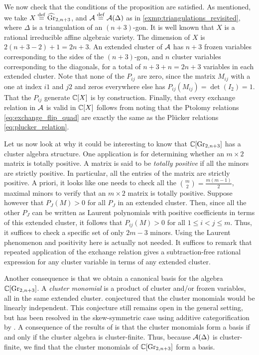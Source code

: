 We now check that the conditions of the proposition are satisfied. As mentioned, we
take $X \overset{\mathrm{def}}{=} \widehat{\operatorname{Gr}}_{2, n+3}$, and $\mathcal{A} \overset{\mathrm{def}}{=} \mathcal{A}(\Delta)$ as in
\cref{exmp:triangulations_revisited}, where $\Delta$ is a triangulation of an
$(n+3)$-gon. It is well known \cite[Proposition 12.7]{FominZelevinsky2003CAFin} that
$X$ is a rational irreducible affine algebraic variety. The dimension of $X$ is $2 (n+3
	- 2) + 1 = 2n +3$. An extended cluster of $\mathcal{A}$ has $n+3$ frozen variables
corresponding to the sides of the $(n+3)$-gon, and $n$ cluster variables corresponding
to the diagonals, for a total of $n+3 + n = 2n +3$ variables in each extended cluster.
Note that none of the $P_{ij}$ are zero, since the matrix $M_{ij}$ with a one at index
$i1$ and $j2$ and zeros everywhere else has $P_{ij}(M_{ij}) = \det(I_2) = 1$. That the
$P_{ij}$ generate $\mathbb{C}[X]$ is by construction. Finally, that every exchange relation
in $\mathcal{A}$ is valid in $\mathbb{C}[X]$ follows from noting that the Ptolomy relations
\cref{eq:exchange_flip_quad} are exactly the same as the Plücker relations
\cref{eq:plucker_relation}.

\medskip

Let us now look at why it could be interesting to know that $\mathbb{C}[\operatorname{Gr}_{2, n+3}]$ has a
cluster algebra structure. One application is for determining whether an $m \times 2$
matrix is totally positive. A matrix is said to be \emph{totally
	positive} if all the minors are strictly positive. In
particular, all the entries of the matrix are strictly positive. A priori, it looks
like one needs to check all the $\binom{m}{2} = \frac{m(m-1)}{2}$, maximal minors to
verify that an $m \times 2$ matrix is totally positive. Suppose however that $P_J(M) >
	0$ for all $P_J$ in an extended cluster. Then, since all the other $P_J$ can be written
as Laurent polynomials with positive coefficients in terms of this extended cluster, it
follows that $P_{ij}(M) > 0$ for all $1 \leq i < j \leq m$. Thus, it suffices to check
a specific set of only $2m - 3$ minors. Using the Laurent phenomenon and positivity
here is actually not needed. It suffices to remark that repeated application of the
exchange relation gives a subtraction-free rational expression for any cluster variable
in terms of any extended cluster.

Another consequence is that we obtain a canonical basis for the algebra $\mathbb{C}[\operatorname{Gr}_{2,
			n+3}]$. A \emph{cluster monomial} is a product of cluster
and/or frozen variables, all in the same extended cluster.
\Textcite{FominZelevinsky2002CAF} conjectured that the cluster monomials would be
linearly independent. This conjecture still remains open in the general setting, but
has been resolved in the skew-symmetric case using additive categorification by
\textcite{CerulliKeller2013LinearIndependenceCMSSCA}. A consequence of the results of
\textcite{GrossHackingKeelKontsevich2018CanonicalBCA} is that the cluster monomials
form a basis if and only if the cluster algebra is cluster-finite. Thus, because
$\mathcal{A}(\Delta)$ is cluster-finite, we find that the cluster monomials of $\mathbb{C}[\operatorname{Gr}_{2,
			n+3}]$ form a basis.

